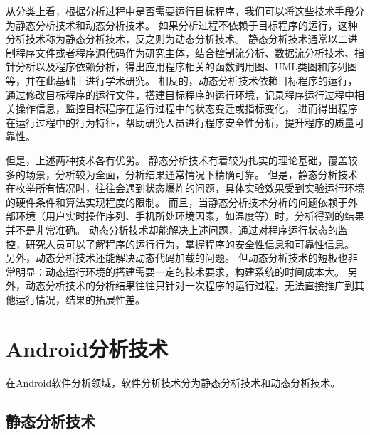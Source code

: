 从分类上看，根据分析过程中是否需要运行目标程序，我们可以将这些技术手段分为静态分析技术和动态分析技术。
如果分析过程不依赖于目标程序的运行，这种分析技术称为静态分析技术，反之则为动态分析技术。
静态分析技术通常以二进制程序文件或者程序源代码作为研究主体，结合控制流分析、数据流分析技术、指针分析以及程序依赖分析，得出应用程序相关的函数调用图、UML类图和序列图等，并在此基础上进行学术研究。
相反的，动态分析技术依赖目标程序的运行，通过修改目标程序的运行文件，搭建目标程序的运行环境，记录程序运行过程中相关操作信息，监控目标程序在运行过程中的状态变迁或指标变化，
进而得出程序在运行过程中的行为特征，帮助研究人员进行程序安全性分析，提升程序的质量可靠性。




但是，上述两种技术各有优劣。
静态分析技术有着较为扎实的理论基础，覆盖较多的场景，分析较为全面，分析结果通常情况下精确可靠。
但是，静态分析技术在枚举所有情况时，往往会遇到状态爆炸的问题，具体实验效果受到实验运行环境的硬件条件和算法实现程度的限制。
而且，当静态分析技术分析的问题依赖于外部环境（用户实时操作序列、手机所处环境因素，如温度等）时，分析得到的结果并不是非常准确。
动态分析技术却能解决上述问题，通过对程序运行状态的监控，研究人员可以了解程序的运行行为，掌握程序的安全性信息和可靠性信息。
另外，动态分析技术还能解决动态代码加载的问题。
但动态分析技术的短板也非常明显：动态运行环境的搭建需要一定的技术要求，构建系统的时间成本大。
另外，动态分析技术的分析结果往往只针对一次程序的运行过程，无法直接推广到其他运行情况，结果的拓展性差。






\section{Android分析技术}

在Android软件分析领域，软件分析技术分为静态分析技术和动态分析技术。

\subsection{静态分析技术}



